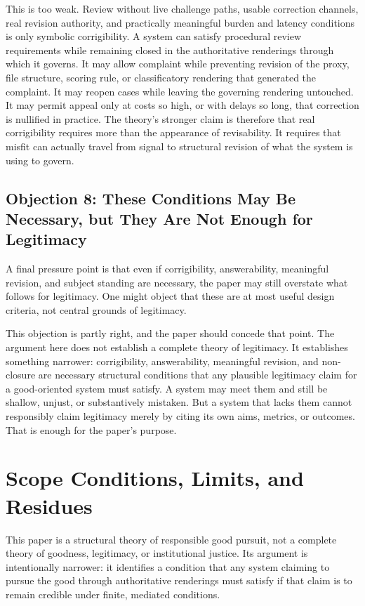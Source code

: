 \documentclass[11pt]{article}
\begin{document}
This is too weak. Review without live challenge paths, usable correction channels, real revision authority, and practically meaningful burden and latency conditions is only symbolic corrigibility. A system can satisfy procedural review requirements while remaining closed in the authoritative renderings through which it governs. It may allow complaint while preventing revision of the proxy, file structure, scoring rule, or classificatory rendering that generated the complaint. It may reopen cases while leaving the governing rendering untouched. It may permit appeal only at costs so high, or with delays so long, that correction is nullified in practice.\cite{MoynihanHerdHarvey2015AdministrativeBurden,Eubanks2018AutomatingInequality} The theory's stronger claim is therefore that real corrigibility requires more than the appearance of revisability. It requires that misfit can actually travel from signal to structural revision of what the system is using to govern.

\subsection{Objection 8: These Conditions May Be Necessary, but They Are Not Enough for Legitimacy}

A final pressure point is that even if corrigibility, answerability, meaningful revision, and subject standing are necessary, the paper may still overstate what follows for legitimacy. One might object that these are at most useful design criteria, not central grounds of legitimacy.

This objection is partly right, and the paper should concede that point. The argument here does not establish a complete theory of legitimacy. It establishes something narrower: corrigibility, answerability, meaningful revision, and non-closure are necessary structural conditions that any plausible legitimacy claim for a good-oriented system must satisfy. A system may meet them and still be shallow, unjust, or substantively mistaken. But a system that lacks them cannot responsibly claim legitimacy merely by citing its own aims, metrics, or outcomes. That is enough for the paper's purpose.
\section{Scope Conditions, Limits, and Residues}

This paper is a structural theory of responsible good pursuit, not a complete theory of goodness, legitimacy, or institutional justice. Its argument is intentionally narrower: it identifies a condition that any system claiming to pursue the good through authoritative renderings must satisfy if that claim is to remain credible under finite, mediated conditions.
\end{document}
